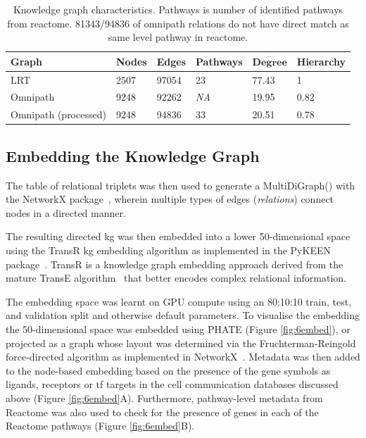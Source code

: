 \begingroup %
\renewcommand{\arraystretch}{1.2} %
    \begin{table}
    \centering
        \begin{tabular}{| p{1.8cm} p{1.8cm} p{1.8cm} p{1.8cm} p{1.8cm} p{1.8cm} |}
            \hline
            \textbf{Graph} & \textbf{Nodes} & \textbf{Edges} & \textbf{Pathways} & $\overline{\textbf{Degree}}$ & \textbf{Hierarchy} \\
            \hline\hline
            LRT & 2507 & 97054 & 23 & 77.43 & 1 \\
            \hline
            Omnipath & 9248 & 92262 & \textit{NA} & 19.95 & 0.82 \\
            \hline
            Omnipath (processed) & 9248 & 94836 & 33 & 20.51 & 0.78 \\
            \hline
        \end{tabular}
    \caption{Knowledge graph characteristics. Pathways is number of identified pathways from reactome. 81343/94836 of omnipath relations do not have direct match as same level pathway in reactome.}
    \label{tab:2kg}
    \end{table}
\endgroup

\subsection{Embedding the Knowledge Graph}

The table of relational triplets was then used to generate a MultiDiGraph() with the NetworkX package~\cite{hagberg_exploring_2008}, wherein multiple types of edges (\emph{relations}) connect nodes in a directed manner. 

The resulting directed \acrshort{kg} was then embedded into a lower 50-dimensional space using the TransR \acrshort{kg} embedding algorithm as implemented in the PyKEEN package~\cite{ali_pykeen_2021}. TransR is a knowledge graph embedding approach derived from the mature TransE algorithm~\cite{bordes_translating_2013} that better encodes complex relational information. 

The embedding space was learnt on GPU compute using an 80:10:10 train, test, and validation split and otherwise default parameters.
To visualise the embedding the 50-dimensional space was embedded using PHATE (Figure \ref{fig:6embed}), or projected as a graph whose layout was determined via the Fruchterman-Reingold force-directed algorithm as implemented in NetworkX~\cite{fruchterman_graph_1991}.
Metadata was then added to the node-based embedding based on the presence of the gene symbols as ligands, receptors or \acrshort{tf} targets in the cell communication databases discussed above (Figure \ref{fig:6embed}A). Furthermore, pathway-level metadata from Reactome was also used to check for the presence of genes in each of the Reactome pathways (Figure \ref{fig:6embed}B).


